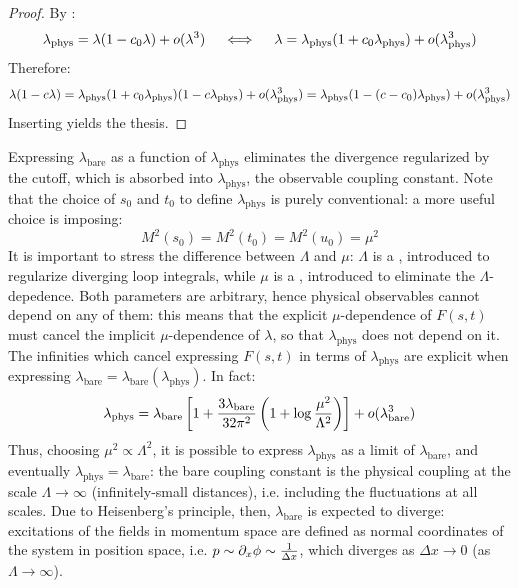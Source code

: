 \begin{proofbox}
  \begin{proof}
    By :
    \begin{equation*}
      \lambda_\text{phys} = \lambda (1 - c_0 \lambda) + o(\lambda^3)
      \quad \iff \quad
      \lambda = \lambda_\text{phys} (1 + c_0 \lambda_\text{phys}) + o(\lambda_\text{phys}^3)
    \end{equation*}
    Therefore:
    \begin{equation*}
      \lambda (1 - c \lambda) = \lambda_\text{phys} (1 + c_0 \lambda_\text{phys}) (1 - c \lambda_\text{phys}) + o(\lambda_\text{phys}^3) = \lambda_\text{phys} (1 - (c - c_0) \lambda_\text{phys}) + o(\lambda_\text{phys}^3)
    \end{equation*}
    Inserting  yields the thesis.
  \end{proof}
\end{proofbox}

Expressing $ \lambda_\text{bare} $ as a function of $ \lambda_\text{phys} $ eliminates the divergence regularized by the cutoff, which is absorbed into $ \lambda_\text{phys} $, the observable coupling constant. Note that the choice of $ s_0 $ and $ t_0 $ to define $ \lambda_\text{phys} $ is purely conventional: a more useful choice is imposing:
\begin{equation}
  M^2(s_0) = M^2(t_0) = M^2(u_0) = \mu^2
\end{equation}
It is important to stress the difference between $ \Lambda $ and $ \mu $: $ \Lambda $ is a , introduced to regularize diverging loop integrals, while $ \mu $ is a , introduced to eliminate the $ \Lambda $-depedence\footnotemark. Both parameters are arbitrary, hence physical observables cannot depend on any of them: this means that the explicit $ \mu $-dependence of $ F(s,t) $ must cancel the implicit $ \mu $-dependence of $ \lambda $, so that $ \lambda_\text{phys} $ does not depend on it. \\
The infinities which cancel expressing $ F(s,t) $ in terms of $ \lambda_\text{phys} $ are explicit when expressing $ \lambda_\text{bare} = \lambda_\text{bare}(\lambda_\text{phys}) $. In fact:
\begin{equation*}
  \lambda_\text{phys} = \lambda_\text{bare} \left[ 1 + \frac{3\lambda_\text{bare}}{32\pi^2} \left( 1 + \log \frac{\mu^2}{\Lambda^2} \right) \right] + o(\lambda_\text{bare}^3)
\end{equation*}
Thus, choosing $ \mu^2 \propto \Lambda^2 $, it is possible to express $ \lambda_\text{phys} $ as a limit of $ \lambda_\text{bare} $, and eventually $ \lambda_\text{phys} = \lambda_\text{bare} $: the bare coupling constant is the physical coupling at the scale $ \Lambda \rightarrow \infty $ (infinitely-small distances), i.e. including the fluctuations at all scales. Due to Heisenberg's principle, then, $ \lambda_\text{bare} $ is expected to diverge: excitations of the fields in momentum space are defined as normal coordinates of the system in position space, i.e. $ p \sim \partial_x \phi \sim \frac{1}{\Delta x} $, which diverges as $ \Delta x \rightarrow 0 $ (as $ \Lambda \rightarrow \infty $).

